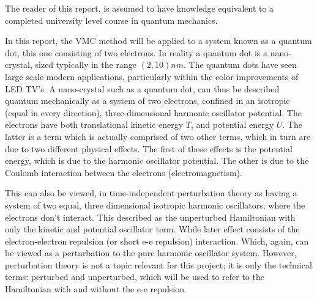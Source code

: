 \documentclass[aip,nobalancelastpage,
twocolumn,
rsi,%
 amsmath,amssymb,
 reprint,%
]{revtex4}
\begin{document}
The reader of this report, is assumed to have knowledge equivalent to a completed university level course in quantum mechanics.\par
In this report, the VMC method will be applied to a system known as a quantum dot, this one consisting of two electrons. In reality a quantum dot is a nano-crystal, sized typically in the range $(2,10)nm$. The quantum dots have seen large scale modern applications, particularly within the color improvements of LED TV's. A nano-crystal such as a quantum dot, can thus be described quantum mechanically as a system of two electrons, confined in an isotropic (equal in every direction), three-dimensional harmonic oscillator potential. 
The electrons have both translational kinetic energy $T$, and potential energy $U$. The latter is a term which is actually comprised of two other terms, which in turn are due to two different physical effects. The first of these effects is the potential energy, which is due to the harmonic oscillator potential. The other is due to the Coulomb interaction between the electrons (electromagnetism). \par
This can also be viewed, in time-independent perturbation theory as having a system of two equal, three dimensional isotropic harmonic oscillators; where the electrons don't interact. This described as the unperturbed Hamiltonian with only the kinetic and potential oscillator term. While later effect consists of the electron-electron repulsion (or short e-e repulsion) interaction. Which, again, can be viewed as a perturbation to the pure harmonic oscillator system. However, perturbation theory is not a topic relevant for this project; it is only the technical terms: perturbed and unperturbed, which will be used to refer to the Hamiltonian with and without the e-e repulsion.\par
\end{document}
